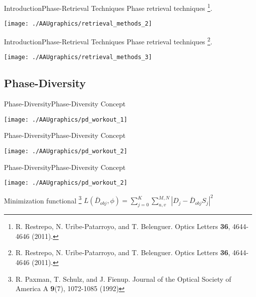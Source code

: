 \documentclass[10pt]{beamer}
\begin{document}
\begin{frame}{Introduction}{Phase-Retrieval Techniques}
Phase  retrieval techniques \footnote[4]{\scriptsize R. Restrepo, N. Uribe-Patarroyo, and T. Belenguer. Optics Letters \textbf{36}, 4644-4646 (2011).}.

\addtocounter{framenumber}{-1}
\vspace{20pt}
\hspace*{-10pt}
\texttt{[image: ./AAUgraphics/retrieval\_methods\_2]}
\end{frame}

\begin{frame}{Introduction}{Phase-Retrieval Techniques}
Phase  retrieval techniques \footnote[4]{\scriptsize R. Restrepo, N. Uribe-Patarroyo, and T. Belenguer. Optics Letters \textbf{36}, 4644-4646 (2011).}.

\addtocounter{framenumber}{-1}
\vspace{20pt}
\hspace*{-10pt}
\texttt{[image: ./AAUgraphics/retrieval\_methods\_3]}
\end{frame}


\subsection{Phase-Diversity}
\begin{frame}{Phase-Diversity}{Phase-Diversity Concept}
\begin{center}
\hspace*{-10pt}
\texttt{[image: ./AAUgraphics/pd\_workout\_1]}
\end{center}
\end{frame}

\begin{frame}{Phase-Diversity}{Phase-Diversity Concept}
\addtocounter{framenumber}{-1}
\hspace*{-10pt}
\texttt{[image: ./AAUgraphics/pd\_workout\_2]}
\end{frame}

\begin{frame}{Phase-Diversity}{Phase-Diversity Concept}
\addtocounter{framenumber}{-1}
\hspace*{-10pt}
\texttt{[image: ./AAUgraphics/pd\_workout\_2]}
\begin{block}{Minimization functional \footnote[5]{R. Paxman, T. Schulz, and J. Fienup. Journal of the Optical Society of America A \textbf{9}(7), 1072-1085 (1992)}}
$L(\bar{D}_{obj},\phi) = \sum\limits_{j=0}^{K}\sum\limits_{u,v}^{M,N}|D_j-\bar{D}_{obj}S_j|^2$
\end{block}
\end{frame}
\end{document}
